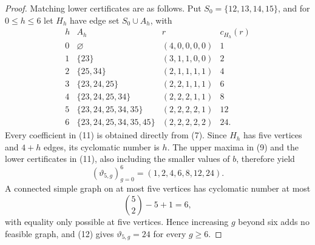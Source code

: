 \documentclass{article}
\begin{document}
\begin{proof}
Matching lower certificates are as follows.  Put \(S_0=\{12,13,14,15\}\), and for \(0\leq h\leq6\) let \(H_h\) have edge set \(S_0\cup A_h\), with
\[
\begin{array}{c|l|c|c}
h&A_h&r&c_{H_h}(r)\\ \hline
0&\varnothing&(4,0,0,0,0)&1\\
1&\{23\}&(3,1,1,0,0)&2\\
2&\{25,34\}&(2,1,1,1,1)&4\\
3&\{23,24,25\}&(2,2,1,1,1)&6\\
4&\{23,24,25,34\}&(2,2,2,1,1)&8\\
5&\{23,24,25,34,35\}&(2,2,2,2,1)&12\\
6&\{23,24,25,34,35,45\}&(2,2,2,2,2)&24.
\end{array}
\tag{11}
\]
Every coefficient in (11) is obtained directly from (7).  Since \(H_h\) has five vertices and \(4+h\) edges, its cyclomatic number is \(h\).  The upper maxima in (9) and the lower certificates in (11), also including the smaller values of \(b\), therefore yield
\[
 (\vartheta_{5,g})_{g=0}^{6}=(1,2,4,6,8,12,24).
\tag{12}
\]
A connected simple graph on at most five vertices has cyclomatic number at most
\[
 \binom52-5+1=6,
\tag{13}
\]
with equality only possible at five vertices.  Hence increasing \(g\) beyond six adds no feasible graph, and (12) gives \(\vartheta_{5,g}=24\) for every \(g\geq6\).
\end{proof}
\end{document}
